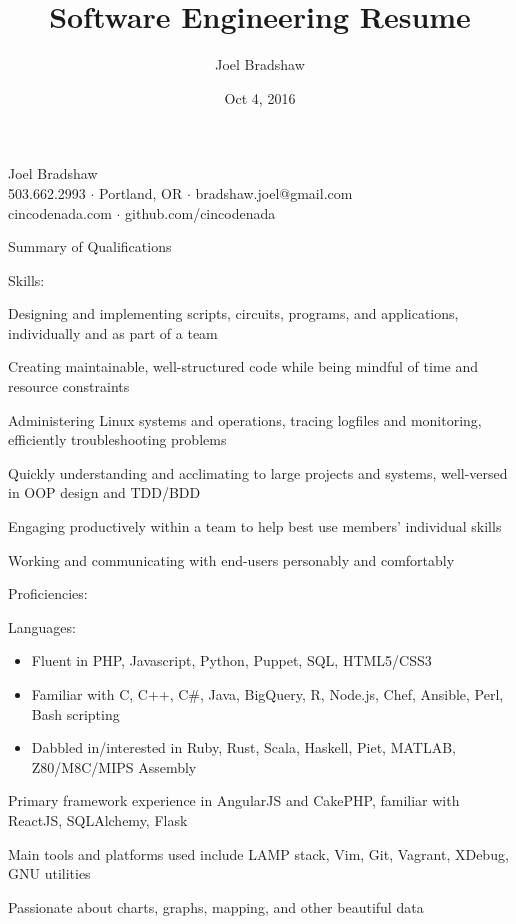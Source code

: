 \documentclass[letterpaper,10pt]{article}
\begin{document}
\sffamily
\title{Software Engineering Resume}
\author{Joel Bradshaw}
\date{Oct 4, 2016}
\begin{center}
{\Huge Joel Bradshaw}\\
\vskip 2pt
{\large
    503.662.2993 \ensuremath{\cdot} Portland, OR \ensuremath{\cdot} bradshaw.joel@gmail.com\\
    cincodenada.com \ensuremath{\cdot} github.com/cincodenada}
\end{center}
\vskip -8pt

\rmfamily
\begin{res_section}{Summary of Qualifications}
\begin{res_subsection}{Skills:}
  \item Designing and implementing scripts, circuits, programs, and applications, individually and as part of a team
  \item Creating maintainable, well-structured code while being mindful of time and resource constraints
  \item Administering Linux systems and operations, tracing logfiles and monitoring, efficiently troubleshooting problems
  \item Quickly understanding and acclimating to large projects and systems, well-versed in OOP design and TDD/BDD
  \item Engaging productively within a team to help best use members' individual skills
  \item Working and communicating with end-users personably and comfortably
\end{res_subsection}
\begin{res_subsection}{Proficiencies:}
  \item Languages:
  \rmfamily
  \def \multicolsep {0pt}
  \setlength{\columnsep}{-8pt}
  \vskip 4pt
  \begin{itemize}
    \item Fluent in PHP, Javascript, Python, Puppet, SQL, HTML5/CSS3
    \item Familiar with C, C++, C\#, Java, BigQuery, R, Node.js, Chef, Ansible, Perl, Bash scripting
    \item Dabbled in/interested in Ruby, Rust, Scala, Haskell, Piet, MATLAB, Z80/M8C/MIPS Assembly
  \end{itemize}
  \item Primary framework experience in AngularJS and CakePHP, familiar with ReactJS, SQLAlchemy, Flask
  \item Main tools and platforms used include LAMP stack, Vim, Git, Vagrant, XDebug, GNU utilities
  \item Passionate about charts, graphs, mapping, and other beautiful data
\end{res_subsection}
\end{res_section}
\end{document}
